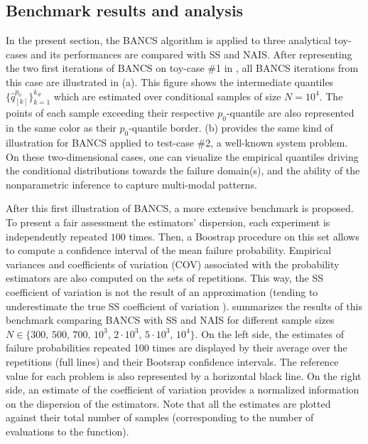 \subsection{Benchmark results and analysis}

In the present section, the BANCS algorithm is applied to three analytical toy-cases and its performances are compared with SS and NAIS. 
After representing the two first iterations of BANCS on toy-case \#1 in , all BANCS iterations from this case are illustrated in  (a). 
This figure shows the intermediate quantiles $\{\widehat{q}_{[k]}^{p_0}\}_{k=1}^{k_\#}$ which are estimated over conditional samples of size $N=10^4$. 
The points of each sample exceeding their respective $p_0$-quantile are also represented in the same color as their $p_0$-quantile border. 
 (b) provides the same kind of illustration for BANCS applied to test-case \#2, a well-known system problem. 
On these two-dimensional cases, one can visualize the empirical quantiles driving the conditional distributions towards the failure domain(s), and the ability of the nonparametric inference to capture multi-modal patterns.  

After this first illustration of BANCS, a more extensive benchmark is proposed. 
To present a fair assessment the estimators' dispersion, each experiment is independently repeated $100$ times. 
Then, a Boostrap procedure on this set allows to compute a confidence interval of the mean failure probability. 
Empirical variances and coefficients of variation (COV) associated with the probability estimators are also computed on the sets of repetitions. 
This way, the SS coefficient of variation is not the result of an approximation (tending to underestimate the true SS coefficient of variation \citealp{Papaioannou_PEM_2015}).
 summarizes the results of this benchmark comparing BANCS with SS and NAIS for different sample sizes $N \in \{300,\, 500,\, 700,\, 10^3,\, 2\cdot10^3,\, 5\cdot10^3,\, 10^4\}$.  
On the left side, the estimates of failure probabilities repeated 100 times are displayed by their average over the repetitions (full lines) and their Bootsrap confidence intervals. 
The reference value for each problem is also represented by a horizontal black line. 
On the right side, an estimate of the coefficient of variation provides a normalized information on the dispersion of the estimators.  
Note that all the estimates are plotted against their total number of samples (corresponding to the number of evaluations to the function). 

